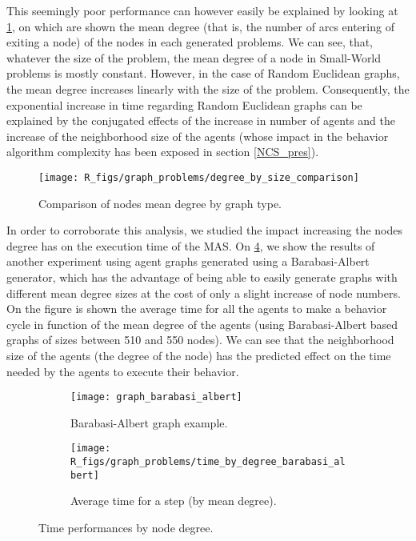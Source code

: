 This seemingly poor performance can however easily be explained by looking at \figurename{} \ref{degree_by_size}, on which are shown the mean degree (that is, the number of arcs entering of exiting a node) of the nodes in each generated problems. We can see, that, whatever the size of the problem, the mean degree of a node in Small-World problems is mostly constant. However, in the case of Random Euclidean graphs, the mean degree increases linearly with the size of the problem. Consequently, the exponential increase in time regarding Random Euclidean graphs can be explained by the conjugated effects of the increase in number of agents and the increase of the neighborhood size of the agents (whose impact in the behavior algorithm complexity has been exposed in section \ref{NCS_pres}).

\begin{figure}
\centering
			\texttt{[image: R\_figs/graph\_problems/degree\_by\_size\_comparison]}
\caption{Comparison of nodes mean degree by graph type.}\label{degree_by_size}
\end{figure}

In order to corroborate this analysis, we studied the impact increasing the nodes degree has on the execution time of the MAS. On \figurename{} \ref{experiment_degrees}, we show the results of another experiment using agent graphs generated using a Barabasi-Albert generator, which has the advantage of being able to easily generate graphs with different mean degree sizes at the cost of only a slight increase of node numbers. On the figure is shown the average time for all the agents to make a behavior cycle in function of the mean degree of the agents (using Barabasi-Albert based graphs of sizes between 510 and 550 nodes). We can see that the neighborhood size of the agents (the degree of the node) has the predicted effect on the time needed by the agents to execute their behavior.

\begin{figure}
\centering
	\begin{subfigure}[b]{0.45\textwidth}
		\texttt{[image: graph\_barabasi\_albert]}
		\caption{Barabasi-Albert graph example.}\label{experiment_degrees:graph}
	\end{subfigure}
	\begin{subfigure}[b]{0.45\textwidth}
			\texttt{[image: R\_figs/graph\_problems/time\_by\_degree\_barabasi\_albert]}
		\caption{Average time for a step (by mean degree).}\label{experiment_degrees:res}
	\end{subfigure}
\caption{Time performances by node degree.}
\label{experiment_degrees}
\end{figure}

